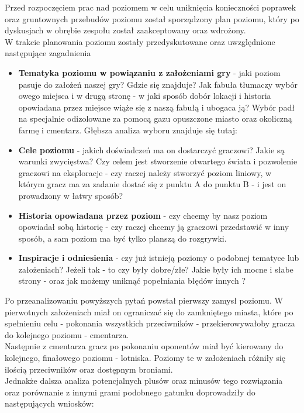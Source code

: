Przed rozpoczęciem prac nad poziomem w celu uniknięcia konieczności poprawek  oraz gruntownych przebudów poziomu został sporządzony plan poziomu, który po dyskusjach w obrębie zespołu został zaakceptowany oraz wdrożony.
\\W trakcie planowania poziomu zostały przedyskutowane oraz uwzględnione następujące zagadnienia
\begin{itemize}
    \item \textbf{Tematyka poziomu w powiązaniu z założeniami gry} - jaki poziom pasuje do założeń naszej gry?
    Gdzie się znajduje? Jak fabuła tłumaczy wybór owego miejsca i w drugą stronę - w jaki sposób dobór lokacji i historia opowiadana przez miejsce wiąże się z naszą fabułą i ubogaca ją? Wybór padł na specjalnie odizolowane za pomocą gazu
    opuszczone miasto oraz okoliczną farmę i cmentarz. Głębsza analiza wyboru znajduje się tutaj:
    \item \textbf{Cele poziomu} - jakich doświadczeń ma on dostarczyć graczowi? Jakie są warunki zwycięstwa? Czy celem jest stworzenie otwartego świata i pozwolenie graczowi na eksploracje - czy raczej należy stworzyć poziom liniowy, w którym gracz ma za zadanie dostać się z punktu A do punktu B - i jest on prowadzony w łatwy sposób?
    \item \textbf{Historia opowiadana przez poziom} - czy chcemy by nasz poziom opowiadał sobą historię - czy raczej chcemy ją graczowi przedstawić w inny sposób, a sam poziom ma być tylko planszą do rozgrywki.
    \item \textbf{Inspiracje i odniesienia} - czy już istnieją poziomy o podobnej tematyce lub założeniach?
    Jeżeli tak - to czy były dobre/złe? Jakie były ich mocne i słabe strony - oraz jak możemy uniknąć popełniania błędów innych ?
\end{itemize}
Po przeanalizowaniu powyższych pytań powstał pierwszy zamysł poziomu. W pierwotnych założeniach miał on ograniczać się do zamkniętego miasta, które po spełnieniu celu - pokonania wszystkich przeciwników - przekierowywałoby gracza do kolejnego poziomu - cmentarza.
\\ Następnie z cmentarza gracz po pokonaniu oponentów miał być kierowany do kolejnego, finałowego poziomu - lotniska.
Poziomy te w założeniach różniły się ilością przeciwników oraz dostępnym broniami.
\\Jednakże dalsza analiza potencjalnych plusów oraz minusów tego rozwiązania oraz porównanie z innymi grami podobnego gatunku doprowadziły do następujących wniosków:\\ \\
